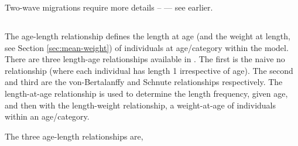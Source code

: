 Two-wave migrations require more details \mbox{--} — see earlier.





\paragraph{}

\paragraph{}

\subsection{\label{sec:derived-quantities}}

\subsection{\label{sec:age-at-age}}

The age-length relationship defines the length at age (and the weight at length, see Section \ref{sec:mean-weight}) of individuals at age/category within the model. There are three length-age relationships available in \CNAME. The first is the naive no relationship (where each individual has length 1 irrespective of age). The second  and third are the von-Bertalanffy and Schnute relationships respectively. The length-at-age relationship is used to determine the length frequency, given age, and then with the length-weight relationship, a weight-at-age of individuals within an age/category. 

The three age-length relationships are,

